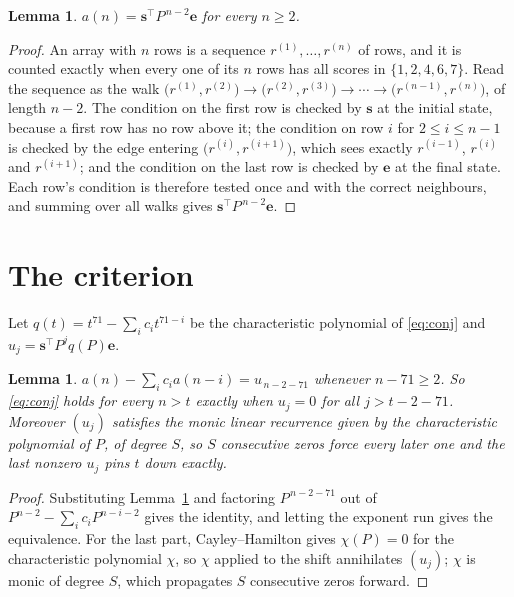\documentclass[11pt,a4paper]{article}
\theoremstyle{plain}
\newtheorem{lemma}[theorem]{Lemma}
\theoremstyle{definition}
\begin{document}
\begin{lemma}\label{lem:walk}
$a(n)=\mathbf{s}^{\!\top}P^{\,n-2}\mathbf{e}$ for every $n\ge2$.
\end{lemma}

\begin{proof}
An array with $n$ rows is a sequence $r^{(1)},\dots,r^{(n)}$ of rows, and it is counted
exactly when every one of its $n$ rows has all scores in $\{1,2,4,6,7\}$. Read the sequence as the
walk $\bigl(r^{(1)},r^{(2)}\bigr)\to\bigl(r^{(2)},r^{(3)}\bigr)\to\cdots\to
\bigl(r^{(n-1)},r^{(n)}\bigr)$, of length $n-2$. The condition on the first row is
checked by $\mathbf{s}$ at the initial state, because a first row has no row above it; the
condition on row $i$ for $2\le i\le n-1$ is checked by the edge entering
$\bigl(r^{(i)},r^{(i+1)}\bigr)$, which sees exactly $r^{(i-1)}$, $r^{(i)}$ and
$r^{(i+1)}$; and the condition on the last row is checked by $\mathbf{e}$ at the final
state. Each row's condition is therefore tested once and with the correct neighbours, and
summing over all walks gives $\mathbf{s}^{\!\top}P^{\,n-2}\mathbf{e}$.
\end{proof}

\section{The criterion}

Let $q(t)=t^{71}-\sum_i c_i t^{71-i}$ be the characteristic polynomial of
\eqref{eq:conj} and $u_j=\mathbf{s}^{\!\top}P^{j}q(P)\mathbf{e}$.

\begin{lemma}\label{lem:crit}
$a(n)-\sum_i c_i a(n-i)=u_{\,n-2-71}$ whenever $n-71\ge2$. So \eqref{eq:conj}
holds for every $n>t$ exactly when $u_j=0$ for all $j>t-2-71$. Moreover $(u_j)$
satisfies the monic linear recurrence given by the characteristic polynomial of $P$, of
degree $S$, so $S$ consecutive zeros force every later one and the last nonzero $u_j$ pins
$t$ down exactly.
\end{lemma}

\begin{proof}
Substituting Lemma~\ref{lem:walk} and factoring $P^{\,n-2-71}$ out of
$P^{n-2}-\sum_i c_i P^{n-i-2}$ gives the identity, and letting the exponent run gives the
equivalence. For the last part, Cayley--Hamilton gives $\chi(P)=0$ for the characteristic
polynomial $\chi$, so $\chi$ applied to the shift annihilates $(u_j)$; $\chi$ is monic of
degree $S$, which propagates $S$ consecutive zeros forward.
\end{proof}
\end{document}
